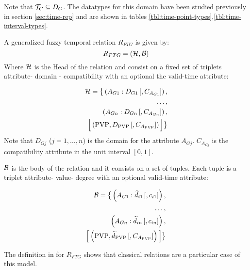 Note that $\mathcal{T}_G \subseteq D_G$. The datatypes for this domain have been studied previously in section \ref{sec:time-rep} and are shown in tables \ref{tbl:time-point-types},\ref{tbl:time-interval-types}.



\begin{definition}
A generalized fuzzy temporal relation $R_{FTG}$ is given by:
\label{def:generalized-fuzzy-temporal-relation}
\begin{equation}
\label{eq:generalized-fuzzy-temporal-relation}
R_{FTG} = \left(\mathcal{H}, \mathcal{B} \right)
\end{equation}
Where $\mathcal{H}$ is the Head of the relation and consist on a fixed set of triplets attribute- domain - compatibility with an optional the valid-time attribute:

\begin{align}
\label{eq:head-valid-time}
\mathcal{H} = \big \lbrace \left(A_{G1}:D_{G1}\left[,C_{A_{G1}} \right] \right),\\
\nonumber
 \ldots,\\
 \nonumber
  \left(A_{Gn}:D_{Gn}\left[,C_{A_{Gn}} \right] \right),\\
  \nonumber
  \Big[  \left( \text{PVP}, D_{\text{PVP}}\left[,C_{A_{\text{PVP}}} \right] \right) \Big] \big \rbrace
\end{align}
Note that $D_{Gj}$ ($j = 1, \ldots, n$) is the domain for the attribute $A_{Gj}$. $C_{A_{Gj}}$ is the compatibility attribute in the unit interval $\left[0, 1 \right]$.

$\mathcal{B}$ is the body of the relation and it consists on a set of tuples. Each tuple is a triplet attribute- value- degree with an optional valid-time attribute:

\begin{align}
\label{eq:body-valid-time}
\mathcal{B} = \big \lbrace \left(A_{G1}:\widetilde{d}_{i1}\left[,c_{i1} \right] \right),\\
\nonumber
 \ldots,\\
 \nonumber
  \left(A_{Gn}:\widetilde{d}_{in}\left[,c_{in} \right] \right),\\
  \nonumber
   \Big[  \left( \text{PVP}, \widetilde{d}_{\text{PVP}} \left[,C_{A_{\text{PVP}}} \right] \right)  \Big] \big \rbrace
\end{align}

\end{definition}


The definition in \cite{Medina1994} for $R_{FTG}$ shows that classical relations are a particular case of this model. 

